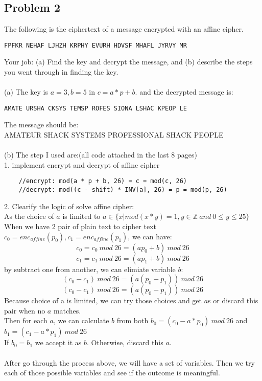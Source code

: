 \documentclass[paper=a4, fontsize=11pt]{scrartcl} %
\numberwithin{equation}{section} %
\numberwithin{figure}{section} %
\newcommand{\problem}[1]{\subsection *{Problem #1}}
\newcommand{\Z}{\mathbb{Z}}
\begin{document}
\problem 2 The following is the ciphertext of a message encrypted with an affine
cipher.
\begin{lstlisting}
FPFKR NEHAF LJHZH KRPHY EVURH HDVSF MHAFL JYRVY MR
\end{lstlisting}
Your job: (a) Find the key and decrypt the message, and (b) describe
the steps you went through in finding the key.\\\\
(a) The key is $a=3, b=5$ in $c=a*p+b$. and the decrypted message is:
\begin{lstlisting}
AMATE URSHA CKSYS TEMSP ROFES SIONA LSHAC KPEOP LE
\end{lstlisting}
The message should be:\\
AMATEUR SHACK SYSTEMS PROFESSIONAL SHACK PEOPLE\\
\\
(b) The step I used are:(all code attached in the last 8 pages)\\
1. implement encrypt and decrypt of affine cipher\\
\begin{lstlisting}
    //encrypt: mod(a * p + b, 26) = c = mod(c, 26)
    //decrypt: mod((c - shift) * INV[a], 26) = p = mod(p, 26)
\end{lstlisting}
2. Clearify the logic of solve affine cipher:\\
As the choice of $a$ is limited to $a \in \{ x| mod(x * y) = 1, y \in \Z \ and \ 0 \leq y \leq 25\}$\\
When we have 2 pair of plain text to cipher text $c_0 = enc_{affine}(p_0), c_1 = enc_{affine}(p_1)$, we can have:
$$ c_0 = c_0\ mod\ 26 = (ap_0+b)\ mod\ 26$$ 
$$ c_1 = c_1\ mod\ 26 = (ap_1+b)\ mod\ 26$$
by subtract one from another, we can elimiate variable $b$:\\
$$(c_0 - c_1)\ mod\ 26 = (a(p_0-p_1))\ mod\ 26$$
$$(c_0 - c_1)\ mod\ 26 = (a(p_0-p_1))\ mod\ 26$$
Because choice of a is limited, we can try those choices and get $a$s or discard this pair when no $a$ matches.\\
Then for each $a$, we can calculate $b$ from both $b_0= (c_0 - a*p_0)\ mod \ 26$ and $b_1= (c_1 - a*p_1)\ mod \ 26$\\
If $b_0 = b_1$ we accept it as $b$. Otherwise, discard this $a$.\\\\
After go through the process above, we will have a set of variables. Then we try each of those possible variables and see if the outcome is meaningful.\\
\end{document}
